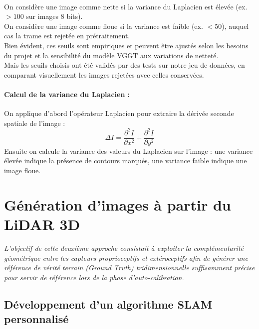 \documentclass[12pt,a4paper,oneside]{report}
\begin{document}
\paragraph{}
On considère une image comme nette si la variance du Laplacien est élevée (ex. $>100$ sur images 8 bits).\\
\hspace*{.5cm}On considère une image comme floue si la variance est faible (ex. $<50$), auquel cas la trame est rejetée en prétraitement.\\

\hspace*{.5cm} Bien évident, ces seuils sont empiriques et peuvent être ajustés selon les besoins du projet et la sensibilité du modèle VGGT aux variations de netteté. \\
Mais les seuils choisis ont été validés par des tests sur notre jeu de données, en comparant visuellement les images rejetées avec celles conservées.

\paragraph{Calcul de la variance du Laplacien :}
On applique d'abord l'opérateur Laplacien pour extraire la dérivée seconde spatiale de l'image :
\[
\Delta I = \frac{\partial^2 I}{\partial x^2} + \frac{\partial^2 I}{\partial y^2}
\]
Ensuite on calcule la variance des valeurs du Laplacien sur l'image : une variance élevée indique la présence de contours marqués, une variance faible indique une image floue.


\newpage

\section{Génération d'images à partir du LiDAR 3D}

\hspace*{0.3cm} \textit{L'objectif de cette deuxième approche consistait à exploiter la complémentarité géométrique entre les capteurs proprioceptifs et extéroceptifs afin de générer une référence de vérité terrain (\textit{Ground Truth}) tridimensionnelle suffisamment précise pour servir de référence lors de la phase d'auto-calibration.}\\

\subsection{Développement d'un algorithme SLAM personnalisé}
\end{document}
